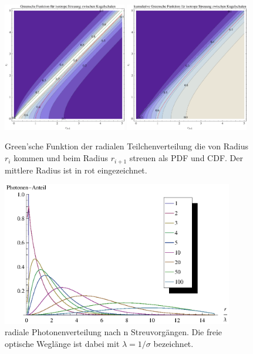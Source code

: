 	\begin{figure}
		\centering
		\includegraphics[width=0.48\textwidth]{radial_greens_function_pdf.eps}
		\includegraphics[width=0.48\textwidth]{radial_greens_function_cdf.eps}
		\caption{Green'sche Funktion der radialen Teilchenverteilung die von Radius $r_i$ kommen und beim Radius $r_{i+1}$ streuen als PDF und CDF. Der mittlere Radius ist in rot eingezeichnet.}
		\label{fig:radial_greens_function_pdfcdf}
	\end{figure}
	\begin{figure}
		\centering
		\includegraphics[width=0.9\textwidth]{gnlist_plot.eps}
		\caption{radiale Photonenverteilung nach n Streuvorgängen. Die freie optische Weglänge ist dabei mit $\lambda=1/\sigma$ bezeichnet.}
		\label{fig:gnlist}
	\end{figure}
